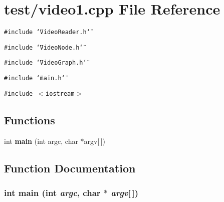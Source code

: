\section{test/video1.cpp File Reference}
\label{video1_8cpp}
{\tt \#include \char`\"{}VideoReader.h\char`\"{}}\par
{\tt \#include \char`\"{}VideoNode.h\char`\"{}}\par
{\tt \#include \char`\"{}VideoGraph.h\char`\"{}}\par
{\tt \#include \char`\"{}main.h\char`\"{}}\par
{\tt \#include $<$iostream$>$}\par
\subsection*{Functions}
\begin{CompactItemize}
\item 
int {\bf main} (int argc, char $\ast$argv[$\,$])
\end{CompactItemize}


\subsection{Function Documentation}
\subsubsection{\setlength{\rightskip}{0pt plus 5cm}int main (int {\em argc}, char $\ast$ {\em argv}[$\,$])}\label{video1_8cpp_28052c36c3b61c6c0eaa18f5d226118f}


